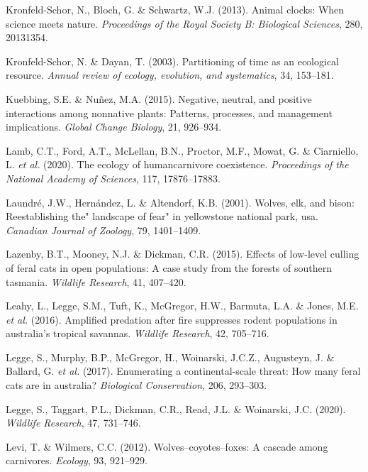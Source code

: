 \documentclass[11pt,a4paper,titlepage,twoside,openright]{style/unimelbthesis}
\begin{document}
\begin{mainmatter}
\leavevmode\hypertarget{ref-kronfeld2013animal}{}%
Kronfeld-Schor, N., Bloch, G. \& Schwartz, W.J. (2013). Animal clocks: When science meets nature. \emph{Proceedings of the Royal Society B: Biological Sciences}, 280, 20131354.

\leavevmode\hypertarget{ref-kronfeld2003partitioning}{}%
Kronfeld-Schor, N. \& Dayan, T. (2003). Partitioning of time as an ecological resource. \emph{Annual review of ecology, evolution, and systematics}, 34, 153--181.

\leavevmode\hypertarget{ref-kuebbing2015negative}{}%
Kuebbing, S.E. \& Nuñez, M.A. (2015). Negative, neutral, and positive interactions among nonnative plants: Patterns, processes, and management implications. \emph{Global Change Biology}, 21, 926--934.

\leavevmode\hypertarget{ref-lamb2020ecology}{}%
Lamb, C.T., Ford, A.T., McLellan, B.N., Proctor, M.F., Mowat, G. \& Ciarniello, L. \emph{et al.} (2020). The ecology of humancarnivore coexistence. \emph{Proceedings of the National Academy of Sciences}, 117, 17876--17883.

\leavevmode\hypertarget{ref-laundre2001wolves}{}%
Laundré, J.W., Hernández, L. \& Altendorf, K.B. (2001). Wolves, elk, and bison: Reestablishing the" landscape of fear" in yellowstone national park, usa. \emph{Canadian Journal of Zoology}, 79, 1401--1409.

\leavevmode\hypertarget{ref-lazenby2015effects}{}%
Lazenby, B.T., Mooney, N.J. \& Dickman, C.R. (2015). Effects of low-level culling of feral cats in open populations: A case study from the forests of southern tasmania. \emph{Wildlife Research}, 41, 407--420.

\leavevmode\hypertarget{ref-leahy2016amplified}{}%
Leahy, L., Legge, S.M., Tuft, K., McGregor, H.W., Barmuta, L.A. \& Jones, M.E. \emph{et al.} (2016). Amplified predation after fire suppresses rodent populations in australia's tropical savannas. \emph{Wildlife Research}, 42, 705--716.

\leavevmode\hypertarget{ref-legge2017enumerating}{}%
Legge, S., Murphy, B.P., McGregor, H., Woinarski, J.C.Z., Augusteyn, J. \& Ballard, G. \emph{et al.} (2017). Enumerating a continental-scale threat: How many feral cats are in australia? \emph{Biological Conservation}, 206, 293--303.

\leavevmode\hypertarget{ref-legge2020cat}{}%
Legge, S., Taggart, P.L., Dickman, C.R., Read, J.L. \& Woinarski, J.C. (2020). \emph{Wildlife Research}, 47, 731--746.

\leavevmode\hypertarget{ref-levi2012wolves}{}%
Levi, T. \& Wilmers, C.C. (2012). Wolves--coyotes--foxes: A cascade among carnivores. \emph{Ecology}, 93, 921--929.


\end{mainmatter}
\end{document}
